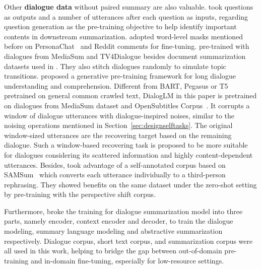 Other \textbf{dialogue data} without paired summary are also valuable.
\citet{feng2020dialogue} took questions as outputs and a number of utterances after each question as inputs, regarding question generation as the pre-training objective to help identify important contents in downstream summarization. 
\citet{khalifa2021bag} adopted word-level masks mentioned 
before on PersonaChat~\cite{zhang2018personalizing} and Reddit comments 
for fine-tuning. 
\citet{qi2021improving} pre-trained with dialogues from MediaSum and TV4Dialogue besides document summarization datasets used in \cite{zhu2020end}. They also stitch dialogues randomly to simulate topic transitions. 
\citet{zhong2021dialoglm} proposed a generative pre-training framework for long dialogue understanding and comprehension. Different from BART, Pegasus or T5 pretrained on general common crawled text, DialogLM in this paper is pretrained on dialogues from MediaSum dataset and OpenSubtitles Corpus~\cite{lison2016opensubtitles2016}. It corrupts a window of dialogue utterances with dialogue-inspired noises, similar to the noising operations mentioned in Section~\ref{sec:designselftasks}. 
The original window-sized utterances are the recovering target based on the remaining dialogue. Such a window-based recovering task is proposed to be more suitable for dialogues considering its scattered information and highly content-dependent utterances. 
Besides, \citet{amanda-etal-2022-shift} took advantage of a self-annotated corpus based on SAMSum~\cite{gliwa2019samsum} which converts each utterance individually to a third-person rephrasing.
They showed benefits on the same dataset under the zero-shot setting by pre-training with the perspective shift corpus.


Furthermore, \citet{zou2021low} broke the training for dialogue summarization 
model into three parts, namely encoder, context encoder and decoder, 
to train the dialogue modeling, summary language modeling and 
abstractive summarization respectively. 
Dialogue corpus, short text corpus, and summarization corpus were all 
used in this work, helping to bridge the gap between out-of-domain 
pre-training and in-domain fine-tuning, especially for low-resource settings.
	
